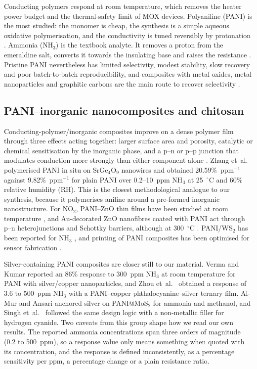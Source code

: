 \documentclass[preprint,11pt]{elsarticle}
\begin{document}
Conducting polymers respond at room temperature, which removes the heater power budget and the thermal-safety limit of MOX devices. Polyaniline (PANI) is the most studied: the monomer is cheap, the synthesis is a simple aqueous oxidative polymerisation, and the conductivity is tuned reversibly by protonation \cite{yang2023panisensors}. Ammonia (NH$_3$) is the textbook analyte. It removes a proton from the emeraldine salt, converts it towards the insulating base and raises the resistance \cite{yang2023panisensors}. Pristine PANI nevertheless has limited selectivity, modest stability, slow recovery and poor batch-to-batch reproducibility, and composites with metal oxides, metal nanoparticles and graphitic carbons are the main route to recover selectivity \cite{masemola2025paniadvances}.

\subsection{PANI--inorganic nanocomposites and chitosan}
\label{sec:lit-composite}
Conducting-polymer/inorganic composites improve on a dense polymer film through three effects acting together: larger surface area and porosity, catalytic or chemical sensitisation by the inorganic phase, and a p--n or p--p junction that modulates conduction more strongly than either component alone \cite{yan2020cpreview}. Zhang et~al.\ \cite{zhang2020panisrge} polymerised PANI in situ on SrGe$_4$O$_9$ nanowires and obtained 20.59\%~ppm$^{-1}$ against 9.82\%~ppm$^{-1}$ for plain PANI over 0.2--10~ppm NH$_3$ at 25~$^{\circ}$C and 60\% relative humidity (RH). This is the closest methodological analogue to our synthesis, because it polymerises aniline around a pre-formed inorganic nanostructure. For NO$_2$, PANI--ZnO thin films have been studied at room temperature \cite{sonker2016panizno}, and Au-decorated ZnO nanofibres coated with PANI act through p--n heterojunctions and Schottky barriers, although at 300~$^{\circ}$C \cite{bonyani2022auzno}. PANI/WS$_2$ has been reported for NH$_3$ \cite{zhao2025paniws2}, and printing of PANI composites has been optimised for sensor fabrication \cite{reiner2022printedpani}.

Silver-containing PANI composites are closer still to our material. Verma and Kumar \cite{verma2024agcupani} reported an 86\% response to 300~ppm NH$_3$ at room temperature for PANI with silver/copper nanoparticles, and Zhou et~al.\ \cite{zhou2024ternary} obtained a response of 3.6 to 500~ppm NH$_3$ with a PANI--copper phthalocyanine--silver ternary film. Al-Mur and Ansari \cite{almur2023agpanimos2} anchored silver on PANI@MoS$_2$ for ammonia and methanol, and Singh et~al.\ \cite{singh2023hcn} followed the same design logic with a non-metallic filler for hydrogen cyanide. Two caveats from this group shape how we read our own results. The reported ammonia concentrations span three orders of magnitude (0.2 to 500~ppm), so a response value only means something when quoted with its concentration, and the response is defined inconsistently, as a percentage sensitivity per ppm, a percentage change or a plain resistance ratio.
\end{document}
